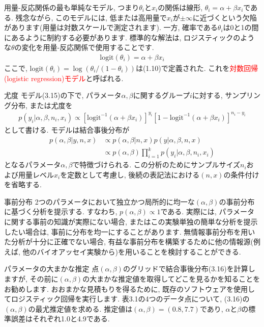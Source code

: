 \documentclass[10pt,dvipdfmx,a4]{beamer}
\newcommand{\eq}[1]{\begin{align}#1\end{align}}
\newcommand{\tcr}[1]{\textcolor{red}{#1}}
\begin{document}

\begin{frame}
用量-反応関係の最も単純なモデル, つまり$\theta_i$と$x_i$の関係は線形, $\theta_i=\alpha+\beta x_i$である.
残念ながら, このモデルには, 低または高用量で$x_i$が$\pm \infty$に近づくという欠陥があります(用量は対数スケールで測定されます).
一方, 確率である$\theta_i$は0と1の間にあるように制約する必要があります.
標準的な解法は, ロジスティックのような$\theta$の変化を用量-反応関係で使用することです.
\eq{\text{logit}(\theta_i)=\alpha+\beta x_i}
ここで, $\text{logit}(\theta_i)=\log (\theta_i/(1-\theta_i))$は(1.10)で定義された.
これを\tcr{対数回帰(logistic regression)モデル}と呼ばれる.
\end{frame}


\begin{frame}{尤度}
モデル(3.15)の下で, パラメータ$\alpha, \beta$に関するグループ$i$に対する, サンプリング分布, または尤度を
\eq{p(y_i|\alpha,\beta,n_i,x_i)\propto[\text{logit}^{-1}(\alpha+\beta x_i)]^{y_i} [1-\text{logit}^{-1}(\alpha+\beta x_i)]^{n_i-y_i}}
として書ける.
モデルは結合事後分布が
\eq{p(\alpha,\beta|y,n,x)&\propto p(\alpha,\beta|n,x)p(y|\alpha,\beta,n,x)\\
&\propto p(\alpha,\beta)\prod_{i=1}^k p(y_i|\alpha,\beta,n_i,x_i)}
となるパラメータ$\alpha, \beta$で特徴づけられる.
この分析のためにサンプルサイズ$n_i$および用量レベル$x_i$を定数として考慮し, 後続の表記法における$(n,x)$の条件付けを省略する.
\end{frame}


\begin{frame}{事前分布}
2つのパラメータにおいて独立かつ局所的に均一な$(\alpha,\beta)$の事前分布に基づく分析を提示する.
すなわち, $p(\alpha,\beta)\propto1$である.
実際には, パラメータに関する事前の知識が実際にない場合, またはこの実験単独の簡単な分析を提示したい場合は, 事前に分布を均一にすることがあります.
無情報事前分布を用いた分析が十分に正確でない場合, 有益な事前分布を構築するために他の情報源(例えば, 他のバイオアッセイ実験から)を用いることを検討することができる.
\end{frame}


\begin{frame}{パラメータの大まかな推定}
点$(\alpha,\beta)$のグリッドで結合事後分布(3.16)を計算しますが, その前に$(\alpha,\beta)$の大まかな推定値を取得してどこを見るかを知ることをお勧めします.
おおまかな見積もりを得るために, 既存のソフトウェアを使用してロジスティック回帰を実行します.
表3.1の4つのデータ点について, (3.16)の$(\alpha,\beta)$の最尤推定値を求める.
推定値は$(\alpha,\beta)=(0.8,7.7)$であり, $\alpha$と$\beta$の標準誤差はそれぞれ1.0と4.9である.
\end{frame}
\end{document}
